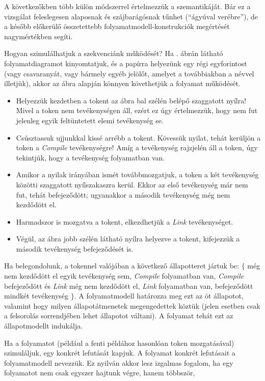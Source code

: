 A következőkben több külön módszerrel értelmezzük a  szemantikáját. Bár ez a vizsgálat feleslegesen alaposnak és szájbarágósnak tűnhet (``ágyúval verébre''), de a később előkerülő összetettebb folyamatmodell-konstrukciók megértését nagymértékben segíti.

\begin{pelda}
Hogyan szimulálhatjuk a szekvenciánk működését? Ha . ábrán látható folyamatdiagramot kinyomtatjuk, és a papírra helyezünk egy régi egyforintost (vagy csavaranyát, vagy bármely egyéb jelölőt, amelyet a továbbiakban a  névvel illetjük), akkor az ábra alapján könnyen követhetjük a folyamat működését. \begin{itemize}
  \item Helyezzük kezdetben a tokent az ábra bal szélén belépő szaggatott nyílra! Mivel a token nem tevékenységen áll, ezért ez úgy értelmezzük, hogy nem fut jelenleg egyik feltüntetett elemi tevékenység se.
  \item Csúsztassuk ujjunkkal kissé arrébb a tokent. Kövessük nyilat, tehát kerüljön a token a \emph{Compile} tevékenységre! Amíg a tevékenység rajzjelén áll a token, úgy tekintjük, hogy a tevékenység folyamatban van.    
  \item Amikor a nyilak irányában ismét továbbmozgatjuk, a token a két tevékenység közötti szaggatott nyílszakaszra kerül. Ekkor az első tevékenység már nem fut, tehát befejeződött; ugyanakkor a második tevékenység még nem kezdődött el.
  \item Harmadszor is mozgatva a tokent, elkezdhetjük a \emph{Link} tevékenységet.  
  \item Végül, az ábra jobb szélén látható nyílra helyezve a tokent, kifejezzük a második tevékenység befejeződését is.  
\end{itemize}   
Ha belegondolunk, a tokennel valójában  a következő állapotteret jártuk be: $\{$ még nem kezdődött el egyik tevékenység sem, \emph{Compile} folyamatban van, \emph{Compile} befejeződött és \emph{Link} még nem kezdődött el, \emph{Link} folyamatban van, befejeződött mindkét tevékenység $\}$. A folyamatmodell határozza meg ezt az öt állapotot, valamint hogy milyen állapotátmenetek megengedettek köztük (jelen esetben csak a felsorolás sorrendjében lehet állapotot váltani). A folyamat tehát ezt az állapotmodellt indukálja. 
\end{pelda}

Ha a folyamatot (például a fenti példához hasonlóan token mozgatásával) szimuláljuk, egy konkrét lefutását kapjuk. A folyamat konkrét lefutásait a folyamatmodell  nevezzük. Ez nyilván akkor lesz izgalmas fogalom, ha egy folyamatot nem csak egyszer hajtunk végre, hanem többször, 


